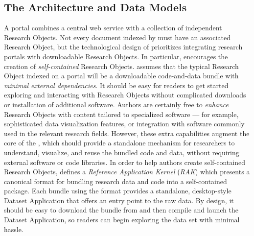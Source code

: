 \documentclass[10pt,letterpaper]{article}
\begin{document}
\subsection{The {\lMOSAIC} Architecture and Data Models}
A {\MOSAIC} portal combines a central web service with a 
collection of independent Research Objects.  Not every 
document indexed by {\MOSAIC} must have an associated 
Research Object, but the technological design of 
{\MOSAIC} prioritizes integrating research portals 
with downloadable Research Objects.
\p{}
In particular, {\MOSAIC} encourages the 
creation of \textit{self-contained} Research Objects.  
{\lfMOSAIC} assumes that the 
typical Research Object indexed on a {\MOSAIC} portal 
will be a downloadable code-and-data bundle 
with \textit{minimal external dependencies}.  
It should be easy for readers to get 
started exploring and interacting with Research Objects 
without complicated downloads or installation of 
additional software.  Authors are certainly free 
to \textit{enhance} Research Objects with 
content tailored to specialized software --- for 
example, sophisticated data visualization features, 
or integration with software commonly used in the 
relevant research fields.  However, these extra capabilities 
augment the core of the {\RO}, which should 
provide a standalone mechanism for researchers to understand, 
visualize, and reuse the bundled code and data, without 
requiring external software or code libraries.
\p{}
In order to help authors create self-contained 
Research Objects, {\MOSAIC} defines a 
\textit{Reference Application Kernel} (\textit{RAK}) 
which presents a canonical format for bundling 
research data and code into a self-contained 
package.   
Each {\RO} bundle using 
the {\RAK} format provides a standalone, desktop-style 
Dataset Application that offers an entry point to 
the raw data.  By design, it should be easy 
to download the {\RAK} bundle from {\MOSAIC} and 
then compile and launch the Dataset Application, so 
readers can begin exploring the data set with 
minimal hassle.  
\end{document}
